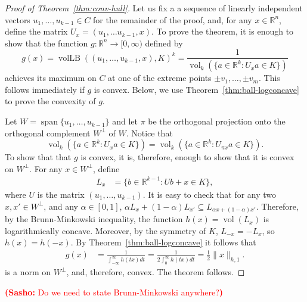\documentclass[11pt]{article}
\newcommand{\R}{{\mathbb{R}}}
\newcommand{\T}{\mathsf T}
\DeclareMathOperator{\vollb}{volLB}
\DeclareMathOperator{\vol}{vol}
\DeclareMathOperator{\lspan}{span}
\newcommand{\notename}[2]{{\textcolor{red}{{\bf (#1:} {#2}{\bf ) }}}}
\newcommand{\notename}[2]{{\textcolor{red}{\footnotesize{\bf (#1:} {#2}{\bf ) }}}}
\newcommand{\snote}[1]{{\notename{Sasho}{#1}}}
\newcommand{\notename}[2]{{}}
\newcommand{\snote}[1]{}
\begin{document}
\begin{proof}[Proof of Theorem~\ref{thm:conv-hull}]
  Let us fix a a sequence of linearly independent vectors $u_1,
  \ldots, u_{k-1} \in C$ for the remainder of the proof,
  and, for any $x\in \R^n$, define the matrix $U_x = (u_1, \ldots
  u_{k-1}, x)$.  To prove the theorem, it is enough to show that the
  function $g: \R^n \to [0, \infty)$ defined by
  \[
  g(x) = \vollb((u_1, \ldots, u_{k-1}, x), K)^k 
  = \frac{1}{\vol_k(\{a \in \R^k: U_x a \in K\})}
  \]
  achieves its maximum on $C$ at one of the extreme points $\pm v_1,
  \ldots, \pm v_m$. This follows immediately if $g$ is
  convex. Below, we use Theorem~\ref{thm:ball-logconcave} to prove the
  convexity of $g$.
  
  Let  $W = \lspan\{u_1, \ldots, u_{k-1}\}$ and let $\pi$ be
  the orthogonal projection onto the orthogonal complement $W^\perp$
  of $W$. Notice that 
  \[
  \vol_k(\{a \in \R^k: U_x a \in K\}) 
  = \vol_k(\{a \in \R^k: U_{\pi x} a \in K\}).
  \]
  To show that that $g$ is convex, it is, therefore, enough to show
  that it is convex on $W^\perp$.  For any $x \in W^\perp$, define 
  \begin{align*}
    L_x &= \{b \in \R^{k-1}: Ub + x \in K\},
  \end{align*}
  where $U$ is the matrix $(u_1, \ldots, u_{k-1})$. It is
  easy to check that for any two $x, x' \in W^\perp$, and any $\alpha
  \in [0,1]$, $\alpha L_{x} + (1-\alpha) L_{x'} \subseteq L_{\alpha x
    + (1-\alpha)x'}$. Therefore, by the Brunn-Minkowski inequality,
  the function $h(x) = \vol(L_x)$ is logarithmically
  concave. Moreover, by the symmetry of $K$, $L_{-x} = -L_x$, so $h(x)
  = h(-x)$.  By Theorem~\ref{thm:ball-logconcave} it follows that 
  \begin{align*}
  g(x) &=\frac{1}{\int_{-\infty}^\infty h(tx) dt}
  = \frac{1}{2\int_{0}^\infty h(tx) dt}
  = \frac{1}{2}\|x\|_{h,1}.
  \end{align*}
  is a norm on $W^\perp$, and, therefore, convex. The theorem follows.
\end{proof}

\snote{Do we need to state Brunn-Minkowski anywhere?}
\end{document}
